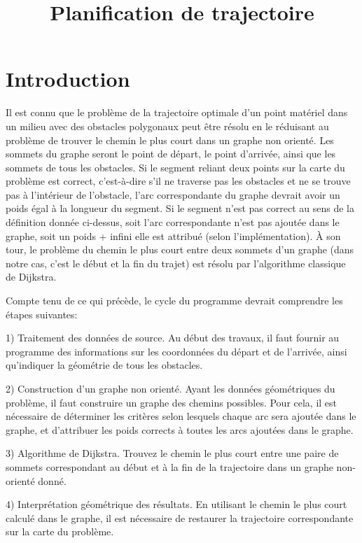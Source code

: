 \documentclass[12pt]{article}
\begin{document}
	
	\tableofcontents
	\title{Planification de trajectoire}
	\maketitle
	\section{Introduction}
	
	Il est connu que le problème de la trajectoire optimale d'un point matériel dans un milieu avec des obstacles polygonaux peut être résolu en le réduisant au problème de trouver le chemin le plus court dans un graphe non orienté. Les sommets du graphe seront le point de départ, le point d'arrivée, ainsi que les sommets de tous les obstacles. Si le segment reliant deux points sur la carte du problème est correct, c'est-à-dire s'il ne traverse pas les obstacles et ne se trouve pas à l'intérieur de l'obstacle, l’arc correspondante du graphe devrait avoir un poids égal à la longueur du segment. Si le segment n'est pas correct au sens de la définition donnée ci-dessus, soit l’arc correspondante n'est pas ajoutée dans le graphe, soit un poids + infini elle est attribué (selon l'implémentation). À son tour, le problème du chemin le plus court entre deux sommets d'un graphe (dans notre cas, c'est le début et la fin du trajet) est résolu par l'algorithme classique de Dijkstra.

	Compte tenu de ce qui précède, le cycle du programme devrait comprendre les étapes suivantes:
	
	1) Traitement des données de source. Au début des travaux, il faut fournir au programme des informations sur les coordonnées du départ et de l'arrivée, ainsi qu'indiquer la géométrie de tous les obstacles.
	
	2) Construction d'un graphe non orienté. Ayant les données géométriques du problème, il faut construire un graphe des chemins possibles. Pour cela, il est nécessaire de déterminer les critères selon lesquels chaque arc sera ajoutée dans le graphe, et d'attribuer les poids corrects à toutes les arcs ajoutées dans le graphe.
	
	3) Algorithme de Dijkstra. Trouvez le chemin le plus court entre une paire de sommets correspondant au début et à la fin de la trajectoire dans un graphe non-orienté donné.
	
	4) Interprétation géométrique des résultats. En utilisant le chemin le plus court calculé dans le graphe, il est nécessaire de restaurer la trajectoire correspondante sur la carte du problème.
	
\end{document}
